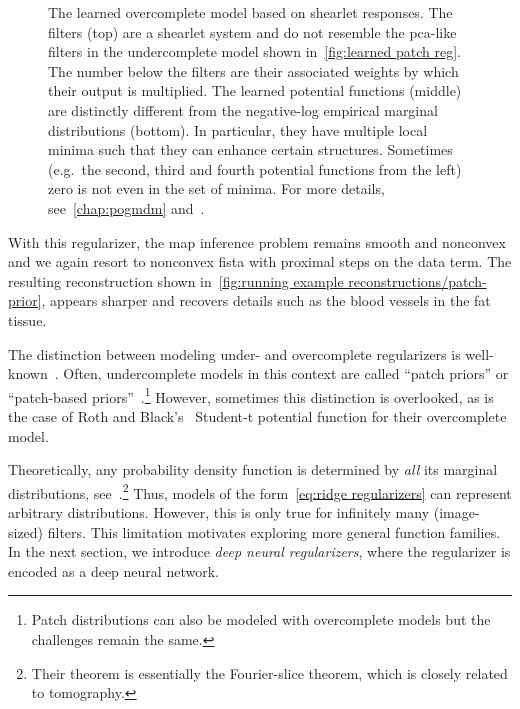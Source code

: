 \begin{figure}
	\caption[Learned directions and potential functions]{%
		The learned overcomplete model based on shearlet responses.
		The filters (top) are a shearlet system and do not resemble the \gls{pca}-like filters in the undercomplete model shown in~\cref{fig:learned patch reg}.
		The number below the filters are their associated weights by which their output is multiplied.
		The learned potential functions (middle) are distinctly different from the negative-log empirical marginal distributions (bottom).
		In particular, they have multiple local minima such that they can enhance certain structures.
		Sometimes (e.g.\ the second, third and fourth potential functions from the left) zero is not even in the set of minima.
		For more details, see~\cref{chap:pogmdm} and~\cite{zach_pogmdm_2024}.
	}%
	\label{fig:learned overcomplete reg}
\end{figure}

With this regularizer, the \gls{map} inference problem remains smooth and nonconvex and we again resort to nonconvex \gls{fista} with proximal steps on the data term.
The resulting reconstruction shown in~\cref{fig:running example reconstructions/patch-prior}, appears sharper and recovers details such as the blood vessels in the fat tissue.

The distinction between modeling under- and overcomplete regularizers is well-known~\cite{chen_trainable_2017,romano_boosting_2017,zhu_filters_1998,zoran_learning_2011}.
Often, undercomplete models in this context are called \enquote{patch priors} or \enquote{patch-based priors}~\cite{zoran_learning_2011}.\footnote{%
	Patch distributions can also be modeled with overcomplete models but the challenges remain the same.
}
However, sometimes this distinction is overlooked, as is the case of Roth and Black's~\cite{RoBl09} Student-t potential function for their overcomplete model.

Theoretically, any probability density function is determined by \emph{all} its marginal distributions, see~\cite[theorem 2]{zhu_filters_1998}.\footnote{%
	Their theorem is essentially the Fourier-slice theorem, which is closely related to tomography.
}
Thus, models of the form~\cref{eq:ridge regularizers} can represent arbitrary distributions.
However, this is only true for infinitely many (image-sized) filters.
This limitation motivates exploring more general function families.
In the next section, we introduce \emph{deep neural regularizers}, where the regularizer is encoded as a deep neural network.
